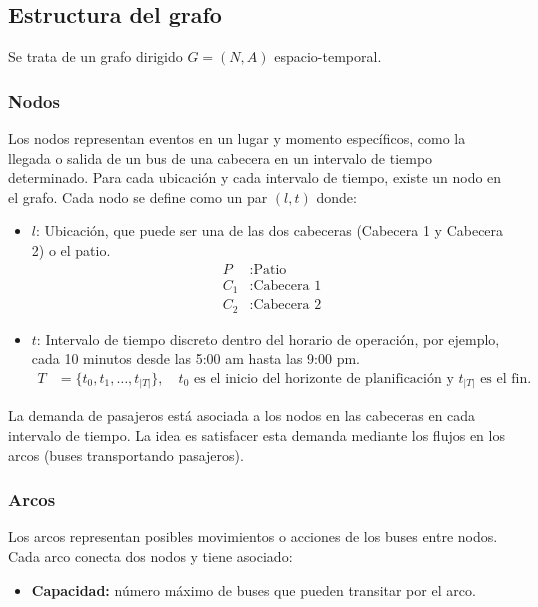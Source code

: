 \documentclass[preprint,11pt]{elsarticle}
\begin{document}
\subsection{Estructura del grafo}

Se trata de un grafo dirigido $G=(N,A)$ espacio-temporal.

\subsubsection{Nodos}
Los nodos representan eventos en un lugar y momento específicos, como la llegada o salida de un bus de una cabecera en un intervalo de tiempo determinado. Para cada ubicación y cada intervalo de tiempo, existe un nodo en el grafo. Cada nodo se define como un par $(l,t)$ donde:
\begin{itemize}
    \item $l$: Ubicación, que puede ser una de las dos cabeceras (Cabecera 1 y Cabecera 2) o el patio.
    \begin{align*}
        P &: \text{Patio}\\
        C_1 &: \text{Cabecera 1}\\
        C_2 &: \text{Cabecera 2}
    \end{align*}
    \item $t$: Intervalo de tiempo discreto dentro del horario de operación, por ejemplo, cada 10 minutos desde las 5:00 am hasta las 9:00 pm.
    \begin{align*}
        T &= \{t_0,t_1,\ldots,t_{|T|}\}, \quad t_0 \text{ es el inicio del horizonte de planificación y } t_{|T|} \text{ es el fin}.
    \end{align*}
\end{itemize}

La demanda de pasajeros está asociada a los nodos en las cabeceras en cada intervalo de tiempo. La idea es satisfacer esta demanda mediante los flujos en los arcos (buses transportando pasajeros).

\subsubsection{Arcos}
Los arcos representan posibles movimientos o acciones de los buses entre nodos. Cada arco conecta dos nodos y tiene asociado:
\begin{itemize}
    \item \textbf{Capacidad:} número máximo de buses que pueden transitar por el arco.
\end{itemize}
\end{document}
